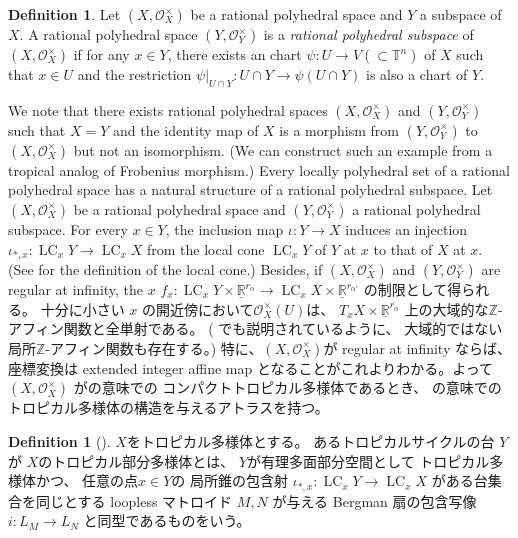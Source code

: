 \documentclass[a4paper,dvipdfmx,reqno,12pt]{amsart}
\theoremstyle{definition}
\newtheorem{definition}[theorem]{Definition}
\newcommand{\opn}[1]{\operatorname{#1}}
\numberwithin{equation}{section}
\begin{document}
\begin{definition}
Let 
$(X,\mathcal{O}_X^{\times})$ be a rational polyhedral space
and $Y$ a subspace of $X$.
A rational polyhedral space $(Y,\mathcal{O}_Y^{\times})$ is 
a \emph{rational polyhedral subspace} of
$(X,\mathcal{O}_X^{\times})$ if 
for any $x\in Y$, there exists an chart
$\psi \colon U \to V (\subset \mathbb{T}^{n})$
of $X$
such that $x\in U$ and the restriction
$\psi|_{U\cap Y}\colon U\cap Y\to 
\psi(U\cap Y)$ is also a chart of $Y$.
\end{definition}
We note that there exists rational polyhedral spaces
$(X,\mathcal{O}_X^{\times})$
and $(Y,\mathcal{O}_Y^{\times})$
such that $X=Y$ and the identity map of $X$ 
is a morphism from $(Y,\mathcal{O}_Y^{\times})$ to
$(X,\mathcal{O}_X^{\times})$ but not an isomorphism.
(We can construct such an example from a tropical analog of
Frobenius morphism.)
Every locally polyhedral set of a rational polyhedral space
\cite[Definition 2.4 (d)]{MR4637248} has a natural 
structure of a rational polyhedral subspace.
Let $(X,\mathcal{O}_X^{\times})$ be a rational
polyhedral space and $(Y,\mathcal{O}_Y^{\times})$
a rational polyhedral subspace.
For every $x\in Y$, 
the inclusion map $\iota\colon Y\to X$ induces
an injection 
$\iota_{*,x}\colon \opn{LC}_x Y\to \opn{LC}_x X$
from the local cone $\opn{LC}_x Y$ of $Y$ at $x$ to 
that of $X$ at $x$.
(See \cite[]{MR4637248} for
the definition of the local cone.)
Besides, if
$(X,\mathcal{O}_X^{\times})$ and
$(Y,\mathcal{O}_Y^{\times})$ are
regular at infinity, 
the $x$
$f_{x}\colon \opn{LC}_x Y\times 
\underline{\mathbb{R}}^{r_{\alpha}}
\to \opn{LC}_x X\times \underline{\mathbb{R}}^{r_{\alpha'}}$
の制限として得られる。
十分に小さい $x$
の開近傍において$\mathcal{O}_X^{\times}(U)$は、
$T_x X\times \underline{\mathbb{R}}^{r_{\alpha}}$
上の大域的な$\mathbb{Z}$-アフィン関数と全単射である。
(\cite[Example 2.1]{MR4637248} でも説明されているように、
大域的ではない局所$\mathbb{Z}$-アフィン関数も存在する。)
特に、$(X,\mathcal{O}_X^{\times})$が regular at infinity
ならば、座標変換は
extended integer affine map \cite[Definition 2.2]{demedrano2023chern}
となることがこれよりわかる。よって
$(X,\mathcal{O}_X^{\times})$ 
が\cite[Definition 6.1]{gross2019sheaftheoretic}の意味での
コンパクトトロピカル多様体であるとき、
\cite[Definition 2.3]{demedrano2023chern}
の意味でのトロピカル多様体の構造を与えるアトラスを持つ。



\begin{definition}[{\cite[Definition 2.14]{demedrano2023chern}}]
$X$をトロピカル多様体とする。
あるトロピカルサイクルの台 $Y$ が
$X$のトロピカル部分多様体とは、
$Y$が有理多面部分空間として
トロピカル多様体かつ、
任意の点$x\in Y$の
局所錐の包含射
$\iota_{*,x}\colon \opn{LC}_x Y\to 
\opn{LC}_x X$
がある台集合を同じとする loopless マトロイド
$M,N$ が与える Bergman 扇の包含写像
$i \colon L_M\to L_N$
と同型であるものをいう。
\end{definition}
\end{document}
